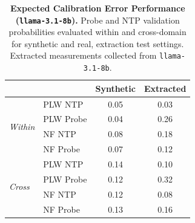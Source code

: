 \begin{table}[ht]
\centering
\begin{tabular}{ll cc}
\toprule
& & Synthetic & Extracted \\
\midrule
\multirow{4}{*}{\textit{Within}}
& PLW NTP & 0.05 & 0.03 \\
& PLW Probe & 0.04 & 0.26 \\
& NF NTP & 0.08 & 0.18 \\
& NF Probe & 0.07 & 0.12 \\
\midrule
\multirow{4}{*}{\textit{Cross}}
& PLW NTP & 0.14 & 0.10 \\
& PLW Probe & 0.12 & 0.32 \\
& NF NTP & 0.12 & 0.08 \\
& NF Probe & 0.13 & 0.16 \\
\bottomrule
\end{tabular}
\caption{\textbf{Expected Calibration Error Performance (\texttt{llama-3.1-8b}).} Probe and NTP validation probabilities evaluated within and cross-domain for synthetic and real, extraction test settings. Extracted measurements collected from \texttt{llama-3.1-8b}.}
\label{tab:llama-3.1-8b-llama-3.1-8b}
\end{table}
